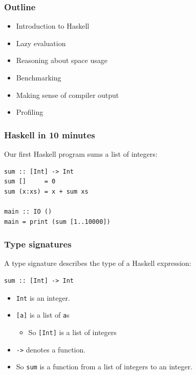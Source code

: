 \documentclass{beamer}
\begin{document}
\begin{frame}
  \frametitle{Outline}

  \begin{itemize}
  \item Introduction to Haskell
  \item Lazy evaluation
  \item Reasoning about space usage
  \item Benchmarking
  \item Making sense of compiler output
  \item Profiling
  \end{itemize}
\end{frame}

\begin{frame}[fragile]
  \frametitle{Haskell in 10 minutes}

  Our first Haskell program sums a list of integers:
  \begin{lstlisting}
sum :: [Int] -> Int
sum []     = 0
sum (x:xs) = x + sum xs

main :: IO ()
main = print (sum [1..10000])
  \end{lstlisting}
\end{frame}

\begin{frame}[fragile]
  \frametitle{Type signatures}

  \begin{definition}
    A \alert{type signature} describes the type of a Haskell expression:
  \end{definition}

  \begin{lstlisting}
sum :: [Int] -> Int
  \end{lstlisting}
  \begin{itemize}
  \item \lstinline!Int! is an integer.
  \item \lstinline![a]! is a list of \lstinline!a!s
    \begin{itemize}
    \item So \lstinline![Int]! is a list of integers
    \end{itemize}
  \item \lstinline!->! denotes a function.
  \item So \lstinline!sum! is a function from a list of integers to an
    integer.
  \end{itemize}
\end{frame}
\end{document}

